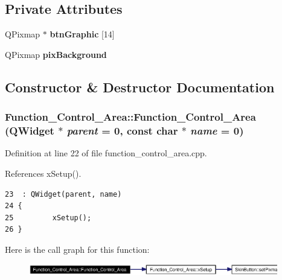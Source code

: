 \subsection*{Private Attributes}
\begin{CompactItemize}
\item 
QPixmap $\ast$ {\bf btn\-Graphic} [14]
\item 
QPixmap {\bf pix\-Background}
\end{CompactItemize}


\subsection{Constructor \& Destructor Documentation}
\subsubsection{\setlength{\rightskip}{0pt plus 5cm}Function\_\-Control\_\-Area::Function\_\-Control\_\-Area ({\bf QWidget} $\ast$ {\em parent} = 0, const char $\ast$ {\em name} = 0)}\label{classFunction__Control__Area_Function__Control__Areaa0}




Definition at line 22 of file function\_\-control\_\-area.cpp.

References x\-Setup().



\footnotesize\begin{verbatim}23  : QWidget(parent, name)
24 {
25         xSetup();
26 }
\end{verbatim}\normalsize 


Here is the call graph for this function:\begin{figure}[H]
\begin{center}
\leavevmode
\includegraphics[width=308pt]{classFunction__Control__Area_Function__Control__Areaa0_cgraph}
\end{center}
\end{figure}
